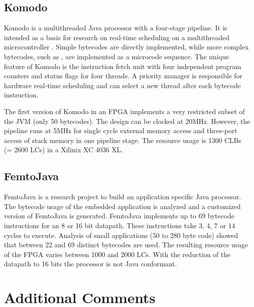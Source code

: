 \subsection{Komodo}
\label{subsec:related:komodo}

Komodo \cite{Zulauf00} is a multithreaded Java processor with a
four-stage pipeline. It is intended as a basis for research on
real-time scheduling on a multithreaded microcontroller
\cite{komodo2003}. Simple bytecodes are directly implemented, while
more complex bytecodes, such as , are implemented as a
microcode sequence. The unique feature of Komodo is the instruction
fetch unit with four independent program counters and status flags
for four threads. A priority manager is responsible for hardware
real-time scheduling and can select a new thread after each bytecode
instruction.


The first version of Komodo in an FPGA implements a very restricted
subset of the JVM (only 50 bytecodes). The design can be clocked at
20MHz. However, the pipeline runs at 5MHz for single cycle external
memory access and three-port access of stack memory in one pipeline
stage. The resource usage is 1300 CLBs (= 2600 LCs) in a Xilinix XC
4036 XL.

\subsection{FemtoJava}

FemtoJava \cite{Femto01} is a research project to build an
application specific Java processor. The bytecode usage of the
embedded application is analyzed and a customized version of
FemtoJava is generated. FemtoJava implements up to 69 bytecode
instructions for an 8 or 16 bit datapath. These instructions take 3,
4, 7 or 14 cycles to execute. Analysis of small applications (50 to
280 byte code) showed that between 22 and 69 distinct bytecodes are
used. The resulting resource usage of the FPGA varies between 1000
and 2000 LCs. With the reduction of the datapath to 16 bits the
processor is not Java conformant.


\section{Additional Comments}

